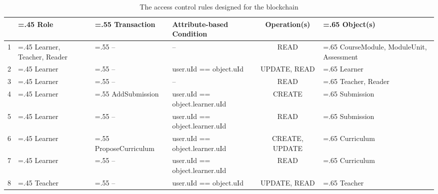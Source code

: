 \begin{landscape}
	\begin{table}[!ht]
		\caption{The access control rules designed for the blockchain}
		\centering
		\label{table:ac_rules}
		\begin{tabularx}{24cm}{l>{\hsize=.45\hsize}X>{\hsize=.55\hsize}X>{\hsize=0.9\hsize}Xc>{\hsize=.65\hsize}X}
			   & Role                     & Transaction                                   & Attribute-based Condition                                      & Operation(s)   & Object(s)                            \\
			\toprule
			1  & Learner, Teacher, Reader & --                                            & --                                                             & READ           & CourseModule, ModuleUnit, Assessment \\
			\midrule
			2  & Learner                  & --                                            & user.uId == object.uId                                         & UPDATE, READ   & Learner                              \\
			\midrule
			3  & Learner                  & --                                            & --                                                             & READ           & Teacher, Reader                      \\
			\midrule
			4  & Learner                  & AddSubmission                                 & user.uId == object.learner.uId                                 & CREATE         & Submission                           \\
			\midrule
			5  & Learner                  & --                                            & user.uId == object.learner.uId                                 & READ           & Submission                           \\
			\midrule
			6  & Learner                  & ProposeCurriculum                             & user.uId == object.learner.uId                                 & CREATE, UPDATE & Curriculum                           \\
			\midrule
			7  & Learner                  & --                                            & user.uId == object.learner.uId                                 & READ           & Curriculum                           \\
			\midrule
			8  & Teacher                  & --                                            & user.uId == object.uId                                         & UPDATE, READ   & Teacher                              \\

\end{tabularx}
\end{table}
\end{landscape}
